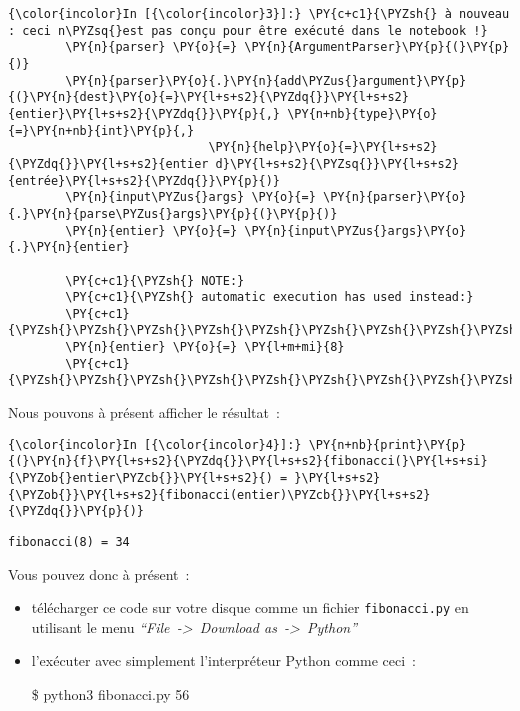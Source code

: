     \begin{Verbatim}[commandchars=\\\{\}]
{\color{incolor}In [{\color{incolor}3}]:} \PY{c+c1}{\PYZsh{} à nouveau : ceci n\PYZsq{}est pas conçu pour être exécuté dans le notebook !}
        \PY{n}{parser} \PY{o}{=} \PY{n}{ArgumentParser}\PY{p}{(}\PY{p}{)}
        \PY{n}{parser}\PY{o}{.}\PY{n}{add\PYZus{}argument}\PY{p}{(}\PY{n}{dest}\PY{o}{=}\PY{l+s+s2}{\PYZdq{}}\PY{l+s+s2}{entier}\PY{l+s+s2}{\PYZdq{}}\PY{p}{,} \PY{n+nb}{type}\PY{o}{=}\PY{n+nb}{int}\PY{p}{,}
                            \PY{n}{help}\PY{o}{=}\PY{l+s+s2}{\PYZdq{}}\PY{l+s+s2}{entier d}\PY{l+s+s2}{\PYZsq{}}\PY{l+s+s2}{entrée}\PY{l+s+s2}{\PYZdq{}}\PY{p}{)}
        \PY{n}{input\PYZus{}args} \PY{o}{=} \PY{n}{parser}\PY{o}{.}\PY{n}{parse\PYZus{}args}\PY{p}{(}\PY{p}{)}
        \PY{n}{entier} \PY{o}{=} \PY{n}{input\PYZus{}args}\PY{o}{.}\PY{n}{entier}
        
        \PY{c+c1}{\PYZsh{} NOTE:}
        \PY{c+c1}{\PYZsh{} automatic execution has used instead:}
        \PY{c+c1}{\PYZsh{}\PYZsh{}\PYZsh{}\PYZsh{}\PYZsh{}\PYZsh{}\PYZsh{}\PYZsh{}\PYZsh{}\PYZsh{}}
        \PY{n}{entier} \PY{o}{=} \PY{l+m+mi}{8}
        \PY{c+c1}{\PYZsh{}\PYZsh{}\PYZsh{}\PYZsh{}\PYZsh{}\PYZsh{}\PYZsh{}\PYZsh{}\PYZsh{}\PYZsh{}}
\end{Verbatim}


    Nous pouvons à présent afficher le résultat~:

    \begin{Verbatim}[commandchars=\\\{\}]
{\color{incolor}In [{\color{incolor}4}]:} \PY{n+nb}{print}\PY{p}{(}\PY{n}{f}\PY{l+s+s2}{\PYZdq{}}\PY{l+s+s2}{fibonacci(}\PY{l+s+si}{\PYZob{}entier\PYZcb{}}\PY{l+s+s2}{) = }\PY{l+s+s2}{\PYZob{}}\PY{l+s+s2}{fibonacci(entier)\PYZcb{}}\PY{l+s+s2}{\PYZdq{}}\PY{p}{)}
\end{Verbatim}


    \begin{Verbatim}[commandchars=\\\{\}]
fibonacci(8) = 34

    \end{Verbatim}

    Vous pouvez donc à présent~:

\begin{itemize}
\item
  télécharger ce code sur votre disque comme un fichier
  \texttt{fibonacci.py} en utilisant le menu
  \emph{``File~-\textgreater{}~Download as~-\textgreater{}~Python''}
\item
  l'exécuter avec simplement l'interpréteur Python comme ceci~:

  \$ python3 fibonacci.py 56
\end{itemize}


    
    
    
